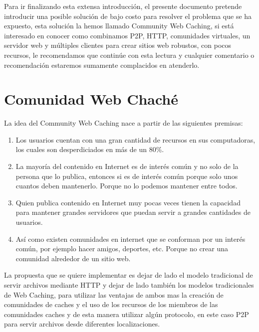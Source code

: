 Para ir finalizando esta extensa introducción, el presente documento pretende introducir una posible solución de bajo costo para resolver el problema que se ha expuesto, esta solución la hemos llamado Community Web Caching, si está interesado en conocer como combinamos P2P, HTTP, comunidades virtuales, un servidor web y múltiples clientes para crear sitios web robustos, con pocos recursos, le recomendamos que continúe con esta lectura y cualquier comentario o recomendación estaremos sumamente complacidos  en atenderlo.


\section{Comunidad Web Chaché}

La idea del Community Web Caching nace a partir de las siguientes premisas:

\begin{enumerate}
\item Los usuarios cuentan con una gran cantidad de recursos en sus computadoras, los cuales son desperdiciados en más de un 80\%.
\item La mayoría del contenido en Internet es de interés común y no solo de la persona que lo publica, entonces si es de interés común porque solo unos cuantos deben mantenerlo. Porque no lo podemos mantener entre todos.
\item Quien publica contenido en Internet muy pocas veces tienen la capacidad para mantener grandes servidores que puedan  servir a grandes cantidades de usuarios.
\item Así como existen comunidades en internet que se conforman por un interés común, por ejemplo hacer amigos, deportes, etc. Porque no crear una comunidad alrededor de un sitio web.
\marginpar{\myTitle \myVersion}
\end{enumerate}

La propuesta que se quiere implementar es dejar de lado el modelo tradicional de servir archivos mediante HTTP y dejar de lado también los modelos tradicionales de Web Caching, para utilizar las ventajas de ambos mas la creación de comunidades de caches y el uso de los recursos de los miembros de las comunidades caches y de esta manera utilizar algún protocolo, en este caso P2P para servir archivos desde diferentes localizaciones.

